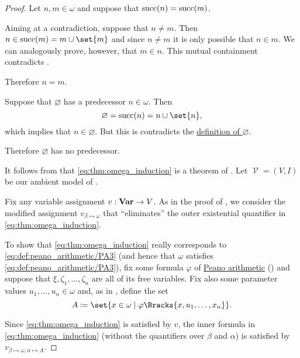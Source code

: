 \begin{proof}
   Let \( n, m \in \omega \) and suppose that \( \operatorname{succ}(n) = \operatorname{succ}(m) \).

  Aiming at a contradiction, suppose that \( n \neq m \). Then \( n \in \op{succ}(m) = m \cup \set{ m } \) and since \( n \neq m \) it is only possible that \( n \in m \). We can analogously prove, however, that \( m \in n \). This mutual containment contradicts .

  Therefore \( n = m \).

   Suppose that \( \varnothing \) has a predecessor \( n \in \omega \). Then
  \begin{equation*}
    \varnothing = \op{succ}(n) = n \cup \set{ n },
  \end{equation*}
  which implies that \( n \in \varnothing \). But this is contradicts the \hyperref[def:empty_set]{definition of \( \varnothing \)}.

  Therefore \( \varnothing \) has no predecessor.

   It follows from  that \eqref{eq:thm:omega_induction} is a theorem of . Let \( \mscrV = (V, I) \) be our ambient model of .

  Fix any variable assignment \( v: \operatorname{\mathbf{Var}} \to V \). As in the proof of , we consider the modified assignment \( v_{\beta \mapsto \omega} \) that \enquote{eliminates} the outer existential quantifier in \eqref{eq:thm:omega_induction}.

  To show that \eqref{eq:thm:omega_induction} really corresponds to \eqref{eq:def:peano_arithmetic/PA3} (and hence that \( \omega \) satisfies \eqref{eq:def:peano_arithmetic/PA3}), fix some formula \( \varphi \) of \hyperref[def:peano_arithmetic]{Peano arithmetic} () and suppose that \( \xi, \zeta_1, \ldots, \zeta_n \) are all of its free variables. Fix also some parameter values \( u_1, \ldots, u_n \in \omega \) and, as in , define the set
  \begin{equation*}
    A \coloneqq \set{ x \in \omega \given \varphi\Bracks{x, u_1, \ldots, x_n} }.
  \end{equation*}

  Since \eqref{eq:thm:omega_induction} is satisfied by \( v \), the inner formula in \eqref{eq:thm:omega_induction} (without the quantifiers over \( \beta \) and \( \alpha \)) is satisfied by \( v_{\beta \mapsto \omega, \alpha \mapsto A} \).


\end{proof}
